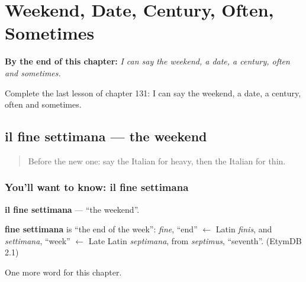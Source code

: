 
\chapter{Weekend, Date, Century, Often, Sometimes}
\label{ch:it-weekend-date-century-often-sometimes}

\begin{chapteropening}
\textbf{By the end of this chapter:} \emph{I can say the weekend, a date, a century, often and sometimes.}

Complete the last lesson of chapter 131: I can say the weekend, a date, a century, often and sometimes.
\end{chapteropening}

\section[il fine settimana]{il fine settimana — the weekend}

\label{lesson:IT-C131-fine-settimana}



\begin{quote}
Before the new one: say the Italian for heavy, then the Italian for thin.
\end{quote}

\subsection*{You'll want to know: il fine settimana}
\textbf{il fine settimana} — \textquotedblleft{}the weekend\textquotedblright{}.

\begin{cousinweb}
\textbf{fine settimana} is \textquotedblleft{}the end of the week\textquotedblright{}: \emph{fine}, \textquotedblleft{}end\textquotedblright{} $\leftarrow$ Latin \emph{finis}, and \emph{settimana}, \textquotedblleft{}week\textquotedblright{} $\leftarrow$ Late Latin \emph{septimana}, from \emph{septimus}, \textquotedblleft{}seventh\textquotedblright{}. (EtymDB 2.1)
\end{cousinweb}

\begin{grammarlens}[title={What you've built}]
One more word for this chapter.
\end{grammarlens}

